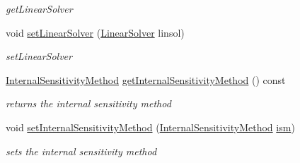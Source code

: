 \begin{DoxyCompactItemize}
\begin{DoxyCompactList}\small\item\em get\+Linear\+Solver \end{DoxyCompactList}\item 
void \mbox{\hyperlink{classamici_1_1_solver_acc8ecf11ad5a8480dd02f757faa264b2}{set\+Linear\+Solver}} (\mbox{\hyperlink{namespaceamici_a1a6a4776314a0843143e5631c3ce21a7}{Linear\+Solver}} linsol)
\begin{DoxyCompactList}\small\item\em set\+Linear\+Solver \end{DoxyCompactList}\item 
\mbox{\hyperlink{namespaceamici_aa444c52f0a5638d68702d1ec92f8db87}{Internal\+Sensitivity\+Method}} \mbox{\hyperlink{classamici_1_1_solver_a256c45c84346e83402b665493e04e65e}{get\+Internal\+Sensitivity\+Method}} () const
\begin{DoxyCompactList}\small\item\em returns the internal sensitivity method \end{DoxyCompactList}\item 
void \mbox{\hyperlink{classamici_1_1_solver_ab114a079f23232a521ad2e81a0a30e36}{set\+Internal\+Sensitivity\+Method}} (\mbox{\hyperlink{namespaceamici_aa444c52f0a5638d68702d1ec92f8db87}{Internal\+Sensitivity\+Method}} \mbox{\hyperlink{classamici_1_1_solver_a5b3b5ca18d3932765358bdf278290861}{ism}})
\begin{DoxyCompactList}\small\item\em sets the internal sensitivity method \end{DoxyCompactList}\end{DoxyCompactItemize}

